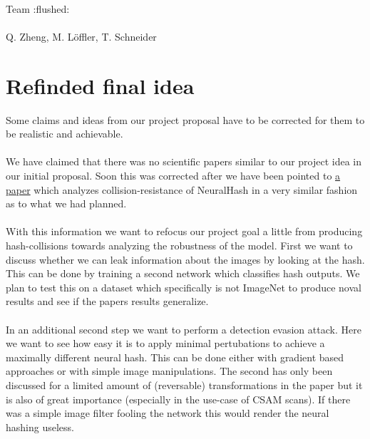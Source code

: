 \documentclass[a4paper]{scrartcl}
\begin{document}
\pagestyle{empty}
\begin{center}
\vspace*{30}
\Huge{}
\\ \\ \\
\Large{Team :flushed:}
\\
\vspace*{100}
\Huge{}
\\
\Large{Q. Zheng, M. Löffler, T. Schneider}
\end{center}
\newpage

\section{Refinded final idea}

Some claims and ideas from our project proposal have to be corrected for them to be realistic and achievable. 
\\
\\
We have claimed that there was no scientific papers similar to our project idea in our initial proposal. Soon this was corrected after we have been pointed to \href{https://arxiv.org/pdf/2111.06628.pdf}{a paper} which analyzes collision-resistance of NeuralHash in a very similar fashion as to what we had planned. 
\\
\\
With this information we want to refocus our project goal a little from producing hash-collisions towards analyzing the robustness of the model. First we want to discuss whether we can leak information about the images by looking at the hash. This can be done by training a second network which classifies hash outputs. We plan to test this on a dataset which specifically is not ImageNet to produce noval results and see if the papers results generalize.  
\\
\\
In an additional second step we want to perform a detection evasion attack. Here we want to see how easy it is to apply minimal pertubations to achieve a maximally different neural hash. This can be done either with gradient based approaches or with simple image manipulations. The second has only been discussed for a limited amount of (reversable) transformations in the paper but it is also of great importance (especially in the use-case of CSAM scans). If there was a simple image filter fooling the network this would render the neural hashing useless.
\end{document}
